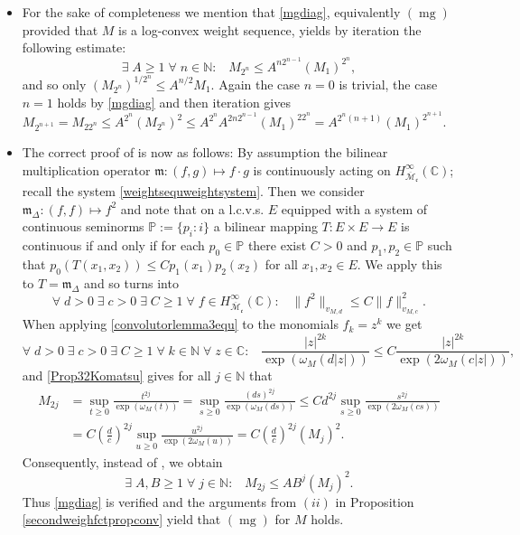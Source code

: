 \documentclass[10pt]{amsart}%
\numberwithin{equation}{section}
\theoremstyle{plain}
\newcommand{\CC}{\mathbb{C}}
\newcommand{\NN}{\mathbb{N}}
\let\on=\operatorname
\begin{document}
\begin{itemize}
\item[$(II)$] For the sake of completeness we mention that \eqref{mgdiag}, equivalently \hyperlink{mg}{$(\on{mg})$} provided that $M$ is a log-convex weight sequence, yields by iteration the following estimate:
    $$\exists\;A\ge 1\;\forall\;n\in\NN:\;\;\;M_{2^n}\le A^{n2^{n-1}}(M_1)^{2^n},$$
    and so only $(M_{2^n})^{1/2^n}\le A^{n/2}M_1$. Again the case $n=0$ is trivial, the case $n=1$ holds by \eqref{mgdiag} and then iteration gives $M_{2^{n+1}}=M_{22^n}\le A^{2^n}(M_{2^n})^2\le A^{2^n}A^{2n2^{n-1}}(M_1)^{22^n}=A^{2^n(n+1)}(M_1)^{2^{n+1}}$.

\item[$(III)$] The correct proof of \cite[Prop. 4.7]{weightedentirecharacterization} is now as follows: By assumption the bilinear multiplication operator $\mathfrak{m}: (f,g)\mapsto f\cdot g$ is continuously acting on $H^{\infty}_{\overline{\mathcal{M}}_{\mathfrak{c}}}(\CC)$; recall the system \eqref{weightsequweightsystem}. Then we consider $\mathfrak{m}_{\Delta}: (f,f)\mapsto f^2$ and note that on a l.c.v.s. $E$ equipped with a system of continuous seminorms $\mathbb{P}:=\{p_i: i\}$ a bilinear mapping $T: E\times E\rightarrow E$ is continuous if and only if for each $p_0\in\mathbb{P}$ there exist $C>0$ and $p_1,p_2\in\mathbb{P}$ such that $p_0(T(x_1,x_2)) \le C p_1(x_1) p_2(x_2)$ for all $x_1, x_2 \in E$. We apply this to $T=\mathfrak{m}_{\Delta}$ and so \cite[$(4.7)$]{weightedentirecharacterization} turns into
    \begin{equation}\label{convolutorlemma3equ}
\forall\;d>0\;\exists\;c>0\;\exists\;C\ge 1\;\forall\;f\in H^{\infty}_{\overline{\mathcal{M}}_{\mathfrak{c}}}(\CC):\;\;\;\|f^2\|_{v_{M,d}}\le C\|f\|^2_{v_{M,c}}.
\end{equation}
When applying \eqref{convolutorlemma3equ} to the monomials $f_k=z^k$ we get
$$\forall\;d>0\;\exists\;c>0\;\exists\;C\ge 1\;\forall\;k\in\NN\;\forall\;z\in\CC:\;\;\;\frac{|z|^{2k}}{\exp(\omega_M(d|z|))}\le C\frac{|z|^{2k}}{\exp(2\omega_M(c|z|))},$$
and \eqref{Prop32Komatsu} gives for all $j\in\NN$ that
\begin{align*}
M_{2j}&=\sup_{t\ge 0}\frac{t^{2j}}{\exp(\omega_{M}(t))}=\sup_{s\ge 0}\frac{(ds)^{2j}}{\exp(\omega_{M}(ds))}\le Cd^{2j}\sup_{s\ge 0}\frac{s^{2j}}{\exp(2\omega_{M}(cs))}
\\&
=C\left(\frac{d}{c}\right)^{2j}\sup_{u\ge 0}\frac{u^{2j}}{\exp(2\omega_{M}(u))}=C\left(\frac{d}{c}\right)^{2j}(M_j)^2.
\end{align*}
Consequently, instead of \cite[$(4.8)$]{weightedentirecharacterization}, we obtain
\begin{equation*}
\exists\;A,B\ge 1\;\forall\;j\in\NN:\;\;\;M_{2j}\le AB^j(M_j)^2.
\end{equation*}
Thus \eqref{mgdiag} is verified and the arguments from $(ii)$ in Proposition \ref{secondweighfctpropconv} yield that \hyperlink{mg}{$(\on{mg})$} for $M$ holds.


\end{itemize}
\end{document}
